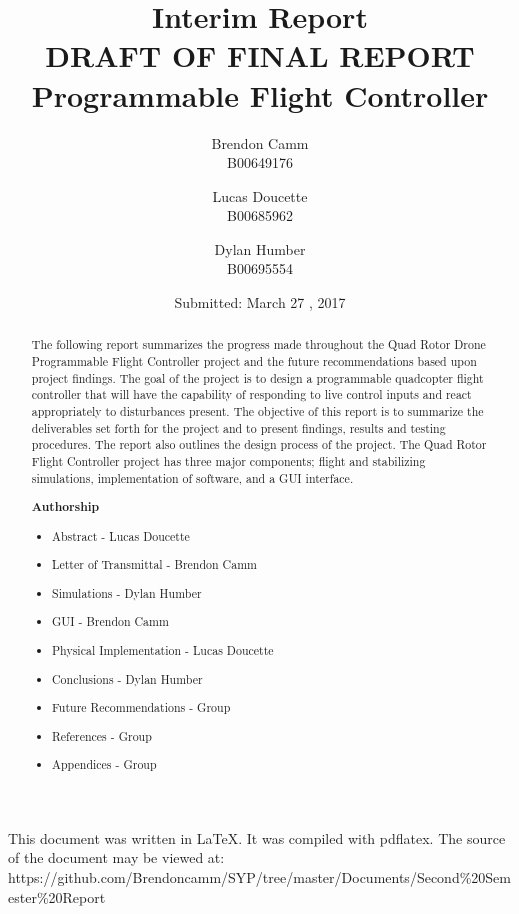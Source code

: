 \documentclass[12pt,letterpaper,titlepage]{article}
\title{Interim Report \\ \small DRAFT OF FINAL REPORT \\ Programmable Flight Controller}
\author{Brendon Camm \\ B00649176 \and Lucas Doucette \\ B00685962 \and Dylan Humber \\ B00695554}
\date{Submitted: March 27 , 2017}
\begin{document}
	\maketitle
	\newpage
	\vspace*{2in}
	This document was written in \LaTeX.  It was compiled with pdflatex.  The source of the document may be viewed at: \newline\small	https://github.com/Brendoncamm/SYP/tree/master/Documents/Second\%20Semester\%20Report
	\vspace*{4in}
	\pagebreak
	
	
	
	\setcounter{tocdepth}{2}
	\setcounter{tocdepth}{3}
	\tableofcontents
	\pagebreak
	
	\begin{abstract} %
		The following report summarizes the progress made throughout the Quad Rotor Drone Programmable Flight Controller project and the future recommendations based upon project findings. The goal of the project is to design a programmable quadcopter flight controller that will have the capability of responding to live control inputs and react appropriately to disturbances present. The objective of this report is to summarize the deliverables set forth for the project and to present findings, results and testing procedures. The report also outlines the design process of the project. The Quad Rotor Flight Controller project has three major components; flight and stabilizing simulations, implementation of software, and a GUI interface.  
		\vspace{0.2in}	
		
		\textbf{Authorship}
		\begin{itemize}
			\itemsep-.5em
			\item{Abstract - Lucas Doucette}
			\item{Letter of Transmittal - Brendon Camm}
			\item{Simulations - Dylan Humber}
			\item{GUI - Brendon Camm}
			\item{Physical Implementation - Lucas Doucette}
			\item{Conclusions - Dylan Humber}
			\item{Future Recommendations - Group}
			\item{References - Group}
			\item{Appendices - Group}
		\end{itemize}
	\end{abstract}
	
\end{document}
